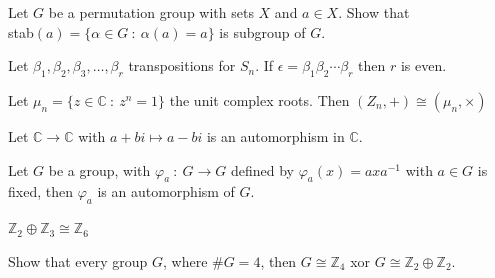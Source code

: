 \begin{assignment}[
  header=HeaderA,
  body=BodyA,
  title={Proved Proposition (Examples) in  Group Theory},
  duedate={\today},
  toc=false,
  toctitle={This appears on the Table of contents.},
  exlist=false
]
\begin{mprop}[14][][prop:14]
Let $G$ be a permutation group with sets $X$ and $a \in X$. Show that\\ stab$(a) = \{\alpha \in G \ : \ \alpha(a) = a \}$ is subgroup of $G$.
\end{mprop}

\begin{mlemma}[19][][lem:19]
Let $\beta_1, \beta_2, \beta_3, \ldots, \beta_r$ transpositions for $S_n$. If $\epsilon = \beta_1\beta_2\cdots\beta_r$ then $r$ is even.
\end{mlemma}

\begin{mprop}[20][][prop:20]
Let $\mu_n = \{ z \in \mathbb{C} \ : \ z^n = 1 \}$ the unit complex roots. Then $(Z_n, +) \cong (\mu_n, \times)$
\end{mprop}

\begin{mprop}[21][][prop:21]
Let $\mathbb{C} \to \mathbb{C}$ with $a+bi \mapsto a-bi$ is an automorphism in $\mathbb{C}$.
\end{mprop}

\begin{mprop}[22][][prop:22]
Let $G$ be a group, with $\varphi_a \ : \ G \to G$ defined by $\varphi_a(x) = axa^{-1}$ with $a \in G$ is fixed, then $\varphi_a$ is an automorphism of $G$.
\end{mprop}

\begin{mprop}[23][][prop:23]
$\mathbb{Z}_2 \oplus \mathbb{Z}_3 \cong \mathbb{Z}_6$
\end{mprop}

\begin{mprop}[24][][prop:24]
Show that every group $G$, where $\# G = 4$, then $G \cong \mathbb{Z}_4$ xor $G \cong \mathbb{Z}_2 \oplus \mathbb{Z}_2$.  
\end{mprop}


\end{assignment}
